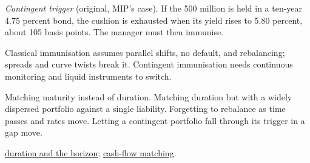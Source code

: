 \begin{qfmethod}
\emph{Contingent trigger} (original, MIP's case). If the 500 million is held in a ten-year 4.75 percent bond, the cushion is exhausted when its yield rises to 5.80 percent, about 105 basis points. The manager must then immunise.

 Classical immunisation assumes parallel shifts, no default, and rebalancing; spreads and curve twists break it. Contingent immunisation needs continuous monitoring and liquid instruments to switch.

 Matching maturity instead of duration. Matching duration but with a widely dispersed portfolio against a single liability. Forgetting to rebalance as time passes and rates move. Letting a contingent portfolio fall through its trigger in a gap move.

 \hyperref[meth:bond-return-decomposition]{duration and the horizon}; \hyperref[meth:liability-matching-ladders]{cash-flow matching}.

\end{qfmethod}
